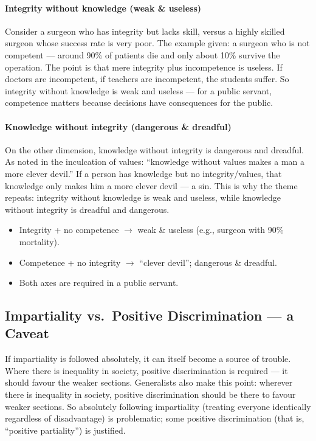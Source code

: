 \paragraph{Integrity without knowledge (weak \& useless)} Consider a surgeon who has integrity but lacks skill, versus a highly skilled surgeon whose success rate is very poor. The example given: a surgeon who is not competent --- around 90\% of patients die and only about 10\% survive the operation. The point is that mere integrity plus incompetence is useless. If doctors are incompetent, if teachers are incompetent, the students suffer. So integrity without knowledge is weak and useless --- for a public servant, competence matters because decisions have consequences for the public.

\paragraph{Knowledge without integrity (dangerous \& dreadful)} On the other dimension, knowledge without integrity is dangerous and dreadful. As noted in the inculcation of values: ``knowledge without values makes a man a more clever devil.'' If a person has knowledge but no integrity/values, that knowledge only makes him a more clever devil --- a sin. This is why the theme repeats: integrity without knowledge is weak and useless, while knowledge without integrity is dreadful and dangerous.

\begin{CriticalPoint}
\begin{itemize}
\item Integrity + no competence $\rightarrow$ weak \& useless (e.g., surgeon with 90\% mortality).
\item Competence + no integrity $\rightarrow$ ``clever devil''; dangerous \& dreadful.
\item Both axes are required in a public servant.
\end{itemize}
\end{CriticalPoint}

\subsection{Impartiality vs.\ Positive Discrimination --- a Caveat}

If impartiality is followed absolutely, it can itself become a source of trouble. Where there is inequality in society, positive discrimination is required --- it should favour the weaker sections. Generalists also make this point: wherever there is inequality in society, positive discrimination should be there to favour weaker sections. So absolutely following impartiality (treating everyone identically regardless of disadvantage) is problematic; some positive discrimination (that is, ``positive partiality'') is justified.


